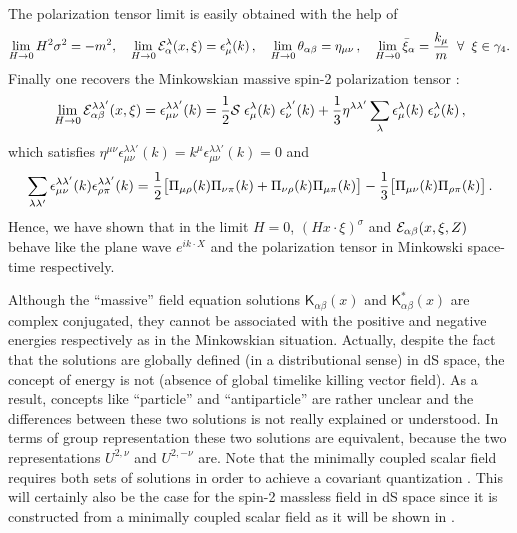 \documentclass[a4paper,11pt,showpacs,preprintnumbers]{revtex4}
\def\K{\textsf{K}}
\begin{document}
The  polarization tensor limit is easily obtained with the help of
$$\lim_{H \rightarrow 0} H^{2}\sigma^{2}=-m^{2},\quad
\lim_{H \rightarrow 0}{\cal
E}_{\alpha}^{\lambda}(x,\xi)=\epsilon_{\mu}^{\lambda}(k)\,,\quad
\lim_{H \rightarrow
0}\theta_{\alpha\beta}=\eta_{\mu\nu}\,,\quad\lim_{H \rightarrow
0}\bar{\xi}_{\alpha}=\frac{k_{\mu}}{m}\;\;\forall\;\;
\xi\in\gamma_{4}.$$ Finally one recovers the Minkowskian massive
spin-2 polarization tensor \cite{pauli}:
$$\lim_{H \rightarrow 0}{\cal E}_{\alpha\beta}^{\lambda\lambda'}(x,\xi)
=\epsilon^{\lambda\lambda'}_{\mu\nu}(k)=\frac{1}{2}{\cal S}\;
\epsilon_{\mu}^{\lambda}(k)\;\epsilon_{\nu}^{\lambda'}(k)
+\frac{1}{3}\eta^{\lambda\lambda'}\sum_{\lambda}\epsilon_{\mu}^{\lambda}(k)\;\epsilon_{\nu}^{\lambda}(k)\,,
$$
which satisfies
$\eta^{\mu\nu}\epsilon^{\lambda\lambda'}_{\mu\nu}(k)=k^{\mu}\epsilon^{\lambda\lambda'}_{\mu\nu}(k)=0$
and
\begin{equation}
\sum_{\lambda\lambda'}\epsilon^{\lambda\lambda'}_{\mu\nu}(k)\epsilon^{\lambda\lambda'}_{\rho\pi}(k)=\frac{1}{2}
\big{[}\Pi_{\mu\rho}(k)\Pi_{\nu\pi}(k)+
\Pi_{\nu\rho}(k)\Pi_{\mu\pi}(k)\big{]}-\frac{1}{3}
\big{[}\Pi_{\mu\nu}(k)\Pi_{\rho\pi}(k)\big{]}\,.
\end{equation}
Hence, we have shown that in the limit $H =0$,
$(Hx\cdot\xi)^{\sigma}$ and ${\cal E}_{\alpha\beta}(x,\xi,Z)$
behave like the plane wave $e^{ik\cdot X}$ and the polarization
tensor in Minkowski space-time respectively.

Although the ``massive'' field equation solutions
$\K_{\alpha\beta}(x)$ and $\K_{\alpha\beta}^{*}(x)$ are complex
conjugated, they  cannot be associated with the positive and
negative energies respectively as in  the Minkowskian situation.
Actually, despite the fact that the solutions are globally defined
(in a distributional sense) in dS space, the concept of energy is
not (absence of global timelike killing vector field). As a
result, concepts like ``particle'' and ``antiparticle'' are rather
unclear and the differences between these two solutions is not
really explained or understood. In terms of group representation
these two solutions are equivalent, because the two
representations $U^{2,\nu}$ and $U^{2,-\nu}$ are.
 Note that the minimally coupled scalar
field requires both sets of solutions in order to achieve a
covariant quantization \cite{gareta1}. This will certainly also be
the case for the spin-2 massless field in dS space since it is
constructed from a minimally coupled scalar field as it will be
shown in \cite{gareta2}.
\end{document}
